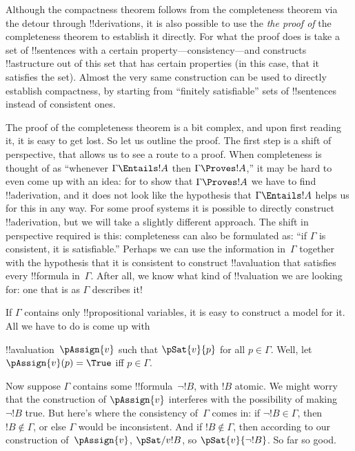 Although the compactness theorem follows from the completeness theorem
via the detour through !!{derivation}s, it is also possible to use the
\emph{the proof of} the completeness theorem to establish it
directly. For what the proof does is take a set of !!{sentence}s with
a certain property---consistency---and constructs !!a{structure} out
of this set that has certain properties (in this case, that it
satisfies the set). Almost the very same construction can be used to
directly establish compactness, by starting from ``finitely
satisfiable'' sets of !!{sentence}s instead of consistent ones.








The proof of the completeness theorem is a bit complex, and upon first
reading it, it is easy to get lost.  So let us outline the proof.  The
first step is a shift of perspective, that allows us to see a route to
a proof.  When completeness is thought of as ``whenever $\Gamma
\Entails !A$ then $\Gamma \Proves !A$,'' it may be hard to even come
up with an idea: for to show that $\Gamma \Proves !A$ we have to find
!!a{derivation}, and it does not look like the hypothesis that
$\Gamma \Entails !A$ helps us for this in any way.  For some proof
systems it is possible to directly construct !!a{derivation}, but we
will take a slightly different approach.  The shift in perspective
required is this: completeness can also be formulated as: ``if
$\Gamma$ is consistent, it is satisfiable.''  Perhaps we can use the
information in~$\Gamma$ together with the hypothesis that it is
consistent to construct !!a{valuation}
that satisfies every !!{formula}
in~$\Gamma$.  After all, we know
what kind of !!{valuation} we are looking
for: one that is as $\Gamma$ describes it!{}

If $\Gamma$ contains only !!{propositional variable}s, it is easy to construct
a model for it. All we have to do is come up with

  !!a{valuation}~$\pAssign{v}$ such that $\pSat{v}{p}$ for all $p \in
  \Gamma$. Well, let $\pAssign{v}(p) = \True$ iff $p \in \Gamma$.

Now suppose $\Gamma$ contains some !!{formula}~$\lnot !B$, with $!B$
atomic.  We might worry that the construction of
$\pAssign{v}$ interferes with the possibility
of making $\lnot !B$ true.  But here's where the consistency
of~$\Gamma$ comes in: if $\lnot !B \in \Gamma$, then $!B \notin
\Gamma$, or else $\Gamma$ would be inconsistent.  And if $!B \notin
\Gamma$, then according to our construction
of~$\pAssign{v}$,
$\pSat/{v}{!B}$, so
$\pSat{v}{\lnot !B}$.  So far so good.

